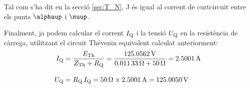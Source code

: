 \begin{exemple}
    Tal com s'ha dit en la secció \ref{sec:T_N}, J és igual al
    corrent de curtcircuit entre els punts $\alphaup$ i $\nuup$.

    Finalment, ja podem calcular el corrent $I_\mathrm{Q}$ i la tensió $U_\mathrm{Q}$ en la
    resistència de càrrega, utilitzant el circuit Thévenin equivalent calculat anteriorment:
    \begin{align*}
        I_\mathrm{Q} &= \frac{E_\mathrm{Th}}{Z_\mathrm{Th} + R_\mathrm{Q}} = \frac{\SI{125,0562}{V}}
        {\SI{0,01133}{\ohm} + \SI{50}{\ohm}} = \SI{2,5001}{A} \\[2ex]
        U_\mathrm{Q} &=  R_\mathrm{Q} \,I_\mathrm{Q} = \SI{50}{\ohm} \times \SI{2,5001}{A} =
        \SI{125,0050}{V}
    \end{align*}
\end{exemple}


